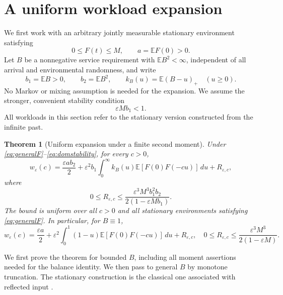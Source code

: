 \documentclass[11pt,reqno]{amsart}
\numberwithin{equation}{section}
\theoremstyle{plain}
\newtheorem{theorem}{Theorem}[section]
\theoremstyle{definition}
\newcommand{\E}{\mathbb E}
\newcommand{\1}{\mathbf 1}
\newcommand{\eps}{\varepsilon}
\begin{document}
\section{A uniform workload expansion}\label{sec:expansion}
We first work with an arbitrary jointly measurable stationary environment satisfying
\begin{equation}\label{eq:generalF}
 0\le F(t)\le M,\qquad a=\E F(0)>0.
\end{equation}
Let $B$ be a nonnegative service requirement with $\E B^2<\infty$, independent of all arrival and environmental randomness, and write
\begin{equation}\label{eq:moments}
 b_1=\E B>0,\qquad b_2=\E B^2,
 \qquad k_B(u)=\E(B-u)_+\quad(u\ge0).
\end{equation}
No Markov or mixing assumption is needed for the expansion. We assume the stronger, convenient stability condition
\begin{equation}\label{eq:domstability}
 \eps M b_1<1.
\end{equation}
All workloads in this section refer to the stationary version constructed from the infinite past.

\begin{theorem}[Uniform expansion under a finite second moment]\label{thm:expansion}
Under \eqref{eq:generalF}--\eqref{eq:domstability}, for every $c>0$,
\begin{equation}\label{eq:expansion}
 w_\eps(c)=\frac{\eps a b_2}{2}
 +\eps^2 b_1\int_0^\infty k_B(u)\E[F(0)F(-cu)]\,du+R_{\eps,c},
\end{equation}
where
\begin{equation}\label{eq:remainder}
 0\le R_{\eps,c}\le
 \frac{\eps^3 M^3 b_1^2 b_2}{2(1-\eps M b_1)}.
\end{equation}
The bound is uniform over all $c>0$ and all stationary environments satisfying \eqref{eq:generalF}. In particular, for $B\equiv1$,
\begin{equation}\label{eq:unitexpansion}
 w_\eps(c)=\frac{\eps a}{2}
 +\eps^2\int_0^1(1-u)\E[F(0)F(-cu)]\,du+R_{\eps,c},
 \quad 0\le R_{\eps,c}\le\frac{\eps^3 M^3}{2(1-\eps M)}.
\end{equation}
\end{theorem}
We first prove the theorem for bounded $B$, including all moment assertions needed for the balance identity. We then pass to general $B$ by monotone truncation. The stationary construction is the classical one associated with reflected input \cite{Loynes62,Asmussen03}.
\end{document}
